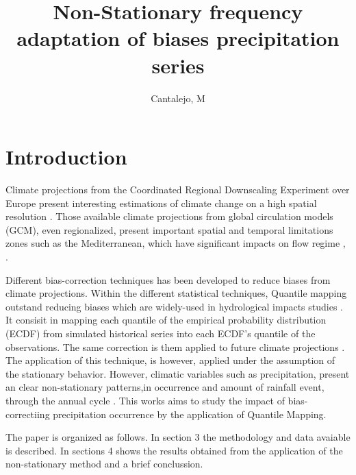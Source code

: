 \documentclass[a4paper,11pt]{article}
\begin{document}
\title{Non-Stationary frequency adaptation of biases precipitation series}
\author{Cantalejo, M}
\maketitle
{}



\section{Introduction}\label{sec1}
Climate projections from the Coordinated Regional Downscaling Experiment over Europe present interesting estimations of climate change on a high spatial resolution  \cite{bib1}. Those available climate projections  from global circulation models (GCM), even regionalized, present important spatial and temporal limitations zones such as the Mediterranean, which have significant impacts on flow regime \cite{bib2} , \cite{bib3}.

Different bias-correction techniques has been developed to reduce biases from climate projections. Within the different statistical techniques, Quantile mapping outstand reducing biases which are widely-used in hydrological impacts studies \cite{bib4}. It consisit in mapping each quantile of the empirical probability distribution (ECDF) from simulated historical series into each ECDF's quantile of the observations. The same correction is them applied to future climate projections \cite{bib5}. The application of this technique, is however, applied under the assumption of the stationary behavior. However, climatic variables such as precipitation, present an clear non-stationary patterns,in occurrence and amount of rainfall event, through the annual cycle \cite{bib6}. This works aims to study the impact of bias-correctiing precipitation occurrence by the application of Quantile Mapping. 

The paper is organized as follows. In section 3 the methodology and data avaiable is described. In sections 4 shows the results obtained from the application of the non-stationary method and a brief conclussion.  
\end{document}
